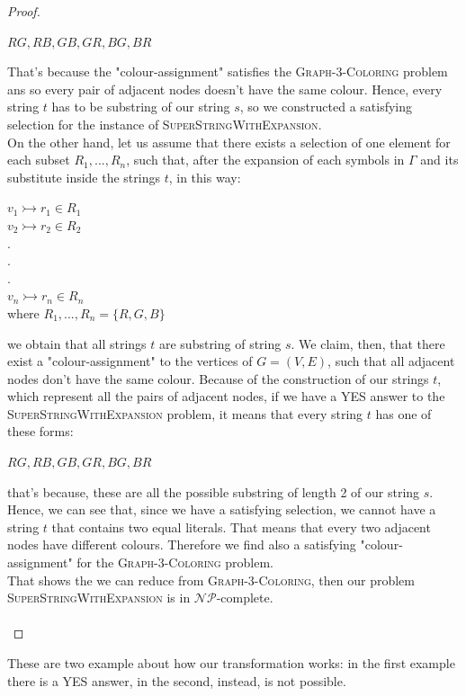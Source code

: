 \documentclass[paper=a4, fontsize=11pt]{scrartcl}
\numberwithin{equation}{section}		%
\numberwithin{figure}{section}			%
\numberwithin{table}{section}				%
\begin{document}
\begin{proof}
     \begin{center}
     	$RG, RB, GB, GR, BG, BR$
     \end{center}
     That's because the "colour-assignment" satisfies the \textsc{Graph-3-Coloring} problem ans so every pair of adjacent nodes doesn't have the same colour. Hence, every string $t$ has to be substring of our string $s$, so we constructed a satisfying selection for the instance of \textsc{SuperStringWithExpansion}. \newline
     \\
     \noindent On the other hand, let us assume that there exists a selection of one element for each subset $R_1,...,R_n$, such that, after the expansion of each symbols in $\Gamma$ and its substitute inside the strings $t$, in this way:
     \begin{center}
     	$v_1 \rightarrowtail r_1\in R_1$ \\
     	$v_2 \rightarrowtail r_2\in R_2$ \\
     	$.$ \\
     	$.$ \\
     	$.$ \\
     	$v_n \rightarrowtail r_n\in R_n$ \\
     	where $R_1,...,R_n = \{R,G,B\}$
     \end{center}
     we obtain that all strings $t$ are substring of string $s$. We claim, then, that there exist a "colour-assignment" to the vertices of $G=(V,E)$, such that all adjacent nodes don't have the same colour. Because of the construction of our strings $t$, which represent all the pairs of adjacent nodes, if we have a YES answer to the \textsc{SuperStringWithExpansion} problem, it means that every string $t$ has one of these forms:
     \begin{center}
     	$RG, RB, GB, GR, BG, BR$
     \end{center}
     that's because, these are all the possible substring of length 2 of our string $s$. Hence, we can see that, since we have a satisfying selection, we cannot have a string $t$ that contains two equal literals. That means that every two adjacent nodes have different colours. Therefore we find also a satisfying "colour-assignment" for the \textsc{Graph-3-Coloring} problem. \newline
     \\
     That shows the we can reduce from \textsc{Graph-3-Coloring}, then our problem \textsc{SuperStringWithExpansion} is in $\mathcal{NP}$-complete. \newline
     \\
     \\
    \end{proof}
     \noindent These are two example about how our transformation works: in the first example there is a YES answer, in the second, instead, is not possible. 
     
\end{document}
